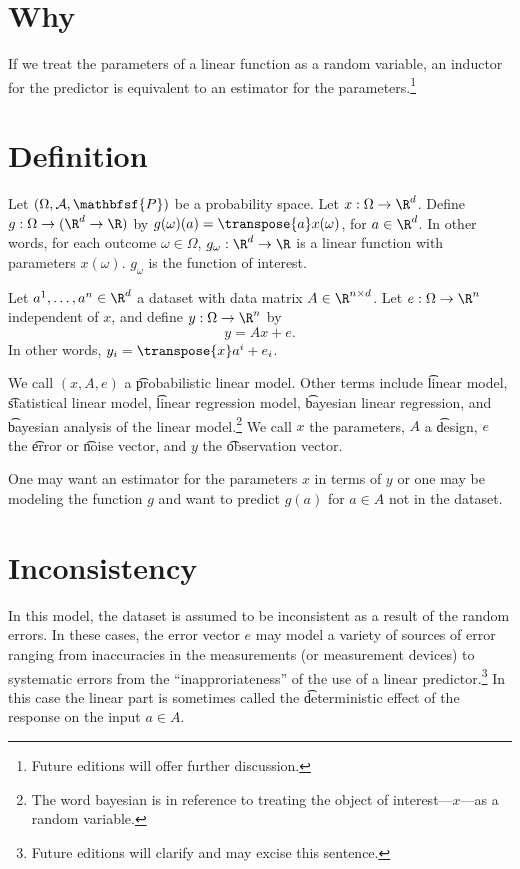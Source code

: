 
\section*{Why}

If we treat the parameters of a linear function as a random variable, an inductor for the predictor is equivalent to an estimator for the parameters.\footnote{Future editions will offer further discussion.}

\section*{Definition}

Let $(\Omega , \mathcal{A} , \mathbfsf{P} )$ be a probability space.
Let $x: \Omega  \to \R ^d$.
Define $g: \Omega  \to (\R ^d \to \R )$ by $g(\omega )(a) = \transpose{a}x(\omega )$, for $a \in \R ^d$.
In other words, for each outcome $\omega  \in \Omega $, $g_\omega : \R ^d \to \R $ is a linear function with parameters $x(\omega )$.
$g_\omega $ is the function of interest.

Let $a^1, \dots , a^n \in \R ^d$ a dataset with data matrix $A \in \R ^{n \times d}$.
Let $e: \Omega  \to \R ^n$ independent of $x$, and define $y: \Omega  \to \R ^n$ by
\[
y = Ax + e.
\]
In other words, $y_i = \transpose{x}a^i + e_i$.

We call $(x, A, e)$ a \t{probabilistic linear model}.
Other terms include \t{linear model}, \t{statistical linear model}, \t{linear regression model}, \t{bayesian linear regression}, and \t{bayesian analysis of the linear model}.\footnote{The word bayesian is in reference to treating the object of interest---$x$---as a random variable.}
We call $x$ the parameters, $A$ a \t{design}, $e$ the \t{error} or \t{noise} vector, and $y$ the \t{observation} vector.

One may want an estimator for the parameters $x$ in terms of $y$ or one may be modeling the function $g$ and want to predict $g(a)$ for $a \in A$ not in the dataset.

\section*{Inconsistency}

In this model, the dataset is assumed to be inconsistent as a result of the random errors.
In these cases, the error vector $e$ may model a variety of sources of error ranging from inaccuracies in the measurements (or measurement devices) to systematic errors from the ``inapproriateness'' of the use of a linear predictor.\footnote{Future editions will clarify and may excise this sentence.}
In this case the linear part is sometimes called the \t{deterministic effect} of the response on the input $a \in A$.

